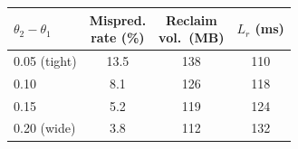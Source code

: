 \begin{tabular}{lccc}
\toprule
$\theta_2-\theta_1$ & \makecell{Mispred.\\rate (\%)} & \makecell{Reclaim\\vol.\ (MB)} & \makecell{$L_r$\\(ms)} \\
\midrule
0.05 (tight) & 13.5 & 138 & 110 \\
0.10 & 8.1 & 126 & 118 \\
0.15 & 5.2 & 119 & 124 \\
0.20 (wide) & 3.8 & 112 & 132 \\
\bottomrule
\end{tabular}
